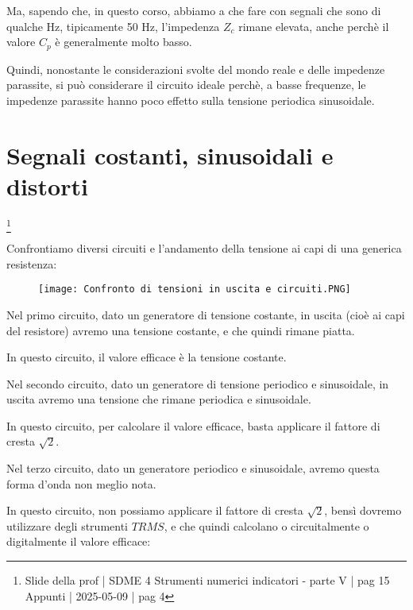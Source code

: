 Ma, sapendo che, in questo corso, abbiamo a che fare con segnali che sono di qualche Hz, tipicamente 50 Hz, 
l'impedenza $Z_c$ rimane elevata, anche perchè il valore $C_p$ è generalmente molto basso. \newline 

Quindi, nonostante le considerazioni svolte del mondo reale e delle impedenze parassite, 
si può considerare il circuito ideale perchè, a basse frequenze, le impedenze parassite hanno poco effetto sulla tensione periodica sinusoidale. \newline 

\newpage 

\section{Segnali costanti, sinusoidali e distorti}
\footnote{Slide della prof | SDME 4 Strumenti numerici indicatori - parte V | pag 15\\  
Appunti | 2025-05-09 | pag 4} 

Confrontiamo diversi circuiti e l'andamento della tensione ai capi di una generica resistenza: 

\begin{figure}[h]
    \centering
    \texttt{[image: Confronto di tensioni in uscita e circuiti.PNG]}
\end{figure}

Nel primo circuito, dato un generatore di tensione costante, in uscita (cioè ai capi del resistore) 
avremo una tensione costante, e che quindi rimane piatta. \newline 

In questo circuito, il valore efficace è la tensione costante. \newline 

Nel secondo circuito, dato un generatore di tensione periodico e sinusoidale, in uscita 
avremo una tensione che rimane periodica e sinusoidale. \newline 

In questo circuito, per calcolare il valore efficace, basta applicare il fattore di cresta $\sqrt{2}$. \newline 

Nel terzo circuito, dato un generatore periodico e sinusoidale, 
avremo questa forma d'onda non meglio nota. \newline 

In questo circuito, non possiamo applicare il fattore di cresta $\sqrt{2}$, 
bensì dovremo utilizzare degli strumenti $TRMS$, e che quindi calcolano o circuitalmente o digitalmente il valore efficace: 

